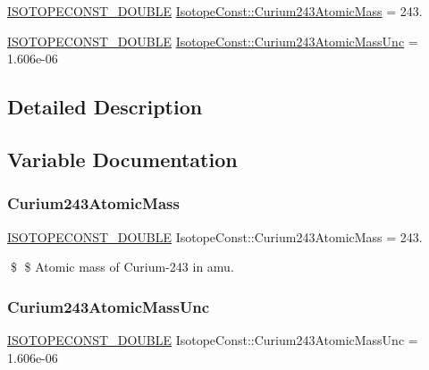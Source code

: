 \begin{DoxyCompactItemize}
\item 
\mbox{\hyperlink{group___isotope_const-_macros_ga8f45a7272ce02c0b4c65c44636ed719a}{I\+S\+O\+T\+O\+P\+E\+C\+O\+N\+S\+T\+\_\+\+D\+O\+U\+B\+LE}} \mbox{\hyperlink{group___isotope_const-_curium-_cm243_ga200ed6ea9c1c1967c6e5bf98ee4795c3}{Isotope\+Const\+::\+Curium243\+Atomic\+Mass}} = 243.
\item 
\mbox{\hyperlink{group___isotope_const-_macros_ga8f45a7272ce02c0b4c65c44636ed719a}{I\+S\+O\+T\+O\+P\+E\+C\+O\+N\+S\+T\+\_\+\+D\+O\+U\+B\+LE}} \mbox{\hyperlink{group___isotope_const-_curium-_cm243_ga0f369e51baf7c99e4f537581ab32d549}{Isotope\+Const\+::\+Curium243\+Atomic\+Mass\+Unc}} = 1.\+606e-\/06
\end{DoxyCompactItemize}


\subsection{Detailed Description}


\subsection{Variable Documentation}
\mbox{\label{group___isotope_const-_curium-_cm243_ga200ed6ea9c1c1967c6e5bf98ee4795c3}} 
\subsubsection{\texorpdfstring{Curium243\+Atomic\+Mass}{Curium243AtomicMass}}
{\footnotesize\ttfamily \mbox{\hyperlink{group___isotope_const-_macros_ga8f45a7272ce02c0b4c65c44636ed719a}{I\+S\+O\+T\+O\+P\+E\+C\+O\+N\+S\+T\+\_\+\+D\+O\+U\+B\+LE}} Isotope\+Const\+::\+Curium243\+Atomic\+Mass = 243.}

\$ \$ Atomic mass of Curium-\/243 in amu. \mbox{\label{group___isotope_const-_curium-_cm243_ga0f369e51baf7c99e4f537581ab32d549}} 
\subsubsection{\texorpdfstring{Curium243\+Atomic\+Mass\+Unc}{Curium243AtomicMassUnc}}
{\footnotesize\ttfamily \mbox{\hyperlink{group___isotope_const-_macros_ga8f45a7272ce02c0b4c65c44636ed719a}{I\+S\+O\+T\+O\+P\+E\+C\+O\+N\+S\+T\+\_\+\+D\+O\+U\+B\+LE}} Isotope\+Const\+::\+Curium243\+Atomic\+Mass\+Unc = 1.\+606e-\/06}

